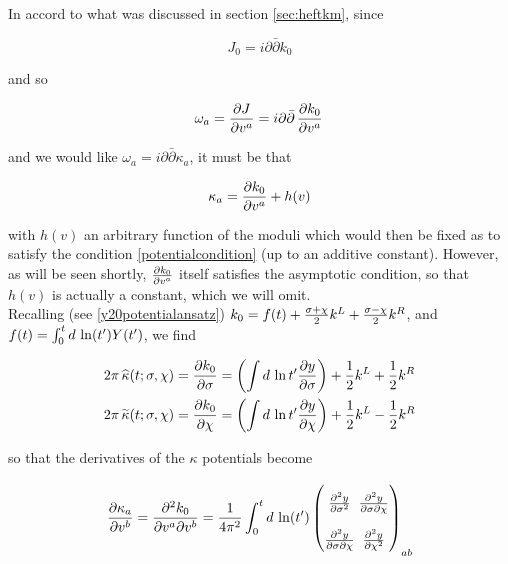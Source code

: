 In accord to what was discussed in section \ref{sec:heftkm}, since 

\begin{equation}
J_0 =  i \partial\bar \partial k_0
\end{equation}

and so

\begin{equation}
	\omega_a = \frac{\partial J}{\partial v^a} = i \partial \bar \partial \,\frac{\partial k_0}{\partial v^a}\,
	\label{}
\end{equation}

and we would like $\omega_a = i \partial\bar \partial \kappa_a$, it must be that 

\begin{equation}
\kappa_a = \frac{\partial k_0}{\partial v^a} + h(v)
\end{equation}

with $h(v)$ an arbitrary function of the moduli which would then be fixed as to satisfy the condition \eqref{potentialcondition} (up to an additive constant). However, as will be seen shortly, $\frac{\partial k_0}{\partial v^a}$ itself satisfies the asymptotic condition, so that $h(v)$ is actually a constant, which we will omit.\\

Recalling (see \eqref{y20potentialansatz}) $k_0 = f(t) + \frac{\sigma+\chi}{2} k^L + \frac{\sigma-\chi}{2} k^R$, and $f(t) = \int_0^t d \, \ln(t') Y(t')$, we find

\begin{align}
 	2\pi \, \widehat{\kappa}(t;\sigma,\chi) =	\frac{\partial k_0}{\partial\sigma} & = \left( \int d\, \ln t' \frac{\partial y}{\partial\sigma} \right) + \frac{1}2 k^L + \frac{1}2 k^R \\
	2\pi \, \widetilde{\kappa}(t;\sigma,\chi) =  \frac{\partial k_0}{\partial\chi} & = \left( \int d\, \ln t' \frac{\partial y}{\partial\chi} \right) + \frac{1}2 k^L - \frac{1}2 k^R
	\label{}
\end{align}


so that the derivatives of the $\kappa$ potentials become

\begin{equation}
\arraycolsep=1.4pt\def\arraystretch{2.2}
\pder{\kappa_a}{v^b} = \frac{\partial^2 k_0}{\partial v^a \partial v^b} = \frac{1}{4 \pi^2} \int_0^t d\, \ln(t')
	\begin{pmatrix}
		\frac{\partial^2 y}{\partial \sigma^2} & \frac{\partial^2 y}{\partial \sigma \partial \elta} \\
		\frac{\partial^2 y}{\partial \sigma\partial \elta} & \frac{\partial^2 y}{\partial \elta^2}
	\end{pmatrix}_{ab}
	\label{}
\end{equation}

